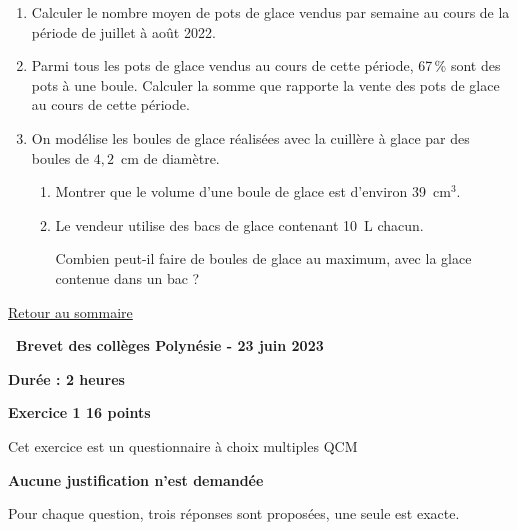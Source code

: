 \documentclass[11pt]{article}
\begin{document}
\begin{enumerate}
\item Calculer le nombre moyen de pots de glace vendus par semaine au cours de la période de juillet à août 2022.
\item Parmi tous les pots de glace vendus au cours de cette période, 67\,\% sont des pots à une boule. Calculer la somme que rapporte la vente des pots de glace au cours de cette période.
\item On modélise les boules de glace réalisées avec la cuillère à glace par des boules de $4,2$~cm de diamètre.
	\begin{enumerate}
		\item Montrer que le volume d'une boule de glace est d'environ 39~cm$^3$.
		\item Le vendeur utilise des bacs de glace contenant 10~L chacun.

Combien peut-il faire de boules de glace au maximum, avec la glace contenue dans un bac ?
	\end{enumerate}
\end{enumerate}

\hyperlink{sommaire}{Retour au sommaire}

\newpage

\setlength{\headheight}{13.59999pt}
\pagestyle{fancy}
\thispagestyle{empty}


\hypertarget{Polynesie}{}
\label{Polynesie}

\begin{center}
{\Large \textbf{\decofourleft~Brevet des collèges Polynésie - 23 juin 2023~\decofourright}}

 \bigskip

\textbf{Durée : 2 heures} \end{center}

\bigskip

\textbf{\large{}Exercice 1 \hfill 16 points}

\medskip

Cet exercice est un questionnaire à choix multiples QCM

\textbf{Aucune justification n'est demandée}

Pour chaque question, trois réponses sont proposées, une seule est exacte.
\end{document}
